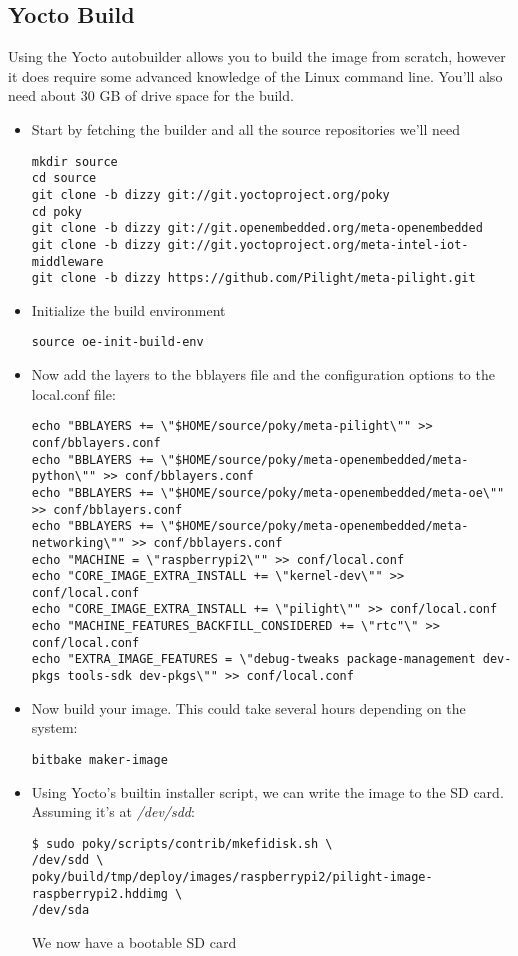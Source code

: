 \subsection{Yocto Build}
Using the Yocto autobuilder allows you to build the image from scratch, however it does require some advanced knowledge of the Linux command line. You'll also need about 30 GB of drive space for the build.
\begin{itemize}
\item Start by fetching the builder and all the source repositories we'll need
\begin{lstlisting}
mkdir source
cd source
git clone -b dizzy git://git.yoctoproject.org/poky
cd poky
git clone -b dizzy git://git.openembedded.org/meta-openembedded
git clone -b dizzy git://git.yoctoproject.org/meta-intel-iot-middleware
git clone -b dizzy https://github.com/Pilight/meta-pilight.git
\end{lstlisting}
\item Initialize the build environment
\begin{lstlisting}
source oe-init-build-env
\end{lstlisting}
\item Now add the layers to the bblayers file and the configuration options to the local.conf file:
\begin{lstlisting}
echo "BBLAYERS += \"$HOME/source/poky/meta-pilight\"" >> conf/bblayers.conf
echo "BBLAYERS += \"$HOME/source/poky/meta-openembedded/meta-python\"" >> conf/bblayers.conf
echo "BBLAYERS += \"$HOME/source/poky/meta-openembedded/meta-oe\"" >> conf/bblayers.conf
echo "BBLAYERS += \"$HOME/source/poky/meta-openembedded/meta-networking\"" >> conf/bblayers.conf
echo "MACHINE = \"raspberrypi2\"" >> conf/local.conf
echo "CORE_IMAGE_EXTRA_INSTALL += \"kernel-dev\"" >> conf/local.conf
echo "CORE_IMAGE_EXTRA_INSTALL += \"pilight\"" >> conf/local.conf
echo "MACHINE_FEATURES_BACKFILL_CONSIDERED += \"rtc"\" >> conf/local.conf
echo "EXTRA_IMAGE_FEATURES = \"debug-tweaks package-management dev-pkgs tools-sdk dev-pkgs\"" >> conf/local.conf
\end{lstlisting}
\item Now build your image. This could take several hours depending on the system:
\begin{lstlisting}
bitbake maker-image
\end{lstlisting}
\item Using Yocto's builtin installer script, we can write the image to the SD card. Assuming it's at \textit{/dev/sdd}:
\begin{lstlisting}
$ sudo poky/scripts/contrib/mkefidisk.sh \
/dev/sdd \
poky/build/tmp/deploy/images/raspberrypi2/pilight-image-raspberrypi2.hddimg \
/dev/sda
\end{lstlisting}
We now have a bootable SD card
\end{itemize}